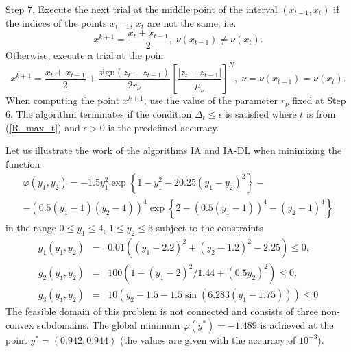 \documentclass[review]{elsarticle}
\begin{document}
	Step 7. Execute the next trial at the middle point of the interval $(x_{t-1}, x_t)$ if the indices of the points $x_{t-1}$, $x_t$ are not the same, i.e.
$$
	x^{k+1} = \frac{x_t + x_{t-1}}{2}, \; \nu(x_{t-1}) \neq \nu(x_t).
$$
Otherwise, execute a trial at the poin
$$
	x^{k+1} = \frac{x_t+x_{t-1}}{2} + \frac{\mathrm{sign}(z_t-z_{t-1})}{2r_\nu}\left[\frac{\left|z_t-z_{t-1}\right|}{\mu_\nu}\right]^N, \; \nu=\nu(x_{t-1})=\nu(x_t).
$$
When computing the point $x^{k+1}$, use the value of the parameter $r_{\nu}$ fixed at Step 6. The algorithm terminates if the condition $\Delta_{t} \leq \epsilon$ is satisfied where $t$ is from (\ref{R_max_t}) and $\epsilon>0$ is the predefined accuracy.

	Let us illustrate the work of the algorithms IA and IA-DL when minimizing the function
\begin{eqnarray}
	\varphi(y_1, y_2)=-1.5y_1^2\exp{\left\{1-y_1^2-20.25(y_1-y_2)^2\right\}}- \nonumber \\
	-\left(0.5(y_1-1)(y_2-1)\right)^4\exp{\left\{2-\left(0.5(y_1-1)\right)^4-(y_2-1)^4\right\}}
	\nonumber
\end{eqnarray}
in the range $0 \leq y_1 \leq 4$, $1 \leq y_2 \leq 3$ subject to the constraints
\begin{eqnarray}
	g_1(y_1, y_2) &=& 0.01 \left( (y_1-2.2)^2+(y_2-1.2)^2-2.25 \right) \leq 0, \nonumber \\
	g_2(y_1, y_2) &=& 100 \left(1-(y_1-2)^2/1.44+(0.5y_2)^2 \right) \leq 0, \nonumber \\
	g_3(y_1, y_2) &=& 10 \left( y_2 - 1.5 - 1.5 \sin{\left( 6.283(y_1-1.75) \right)}\right) \leq 0
	\nonumber
\end{eqnarray}
The feasible domain of this problem is not connected and consists of three non-convex subdomains. The global minimum $\varphi(y^\ast)=-1.489$ is achieved at the point $y^\ast =(0.942, 0.944)$ (the values are given with the accuracy of $10^{-3}$).
\end{document}
